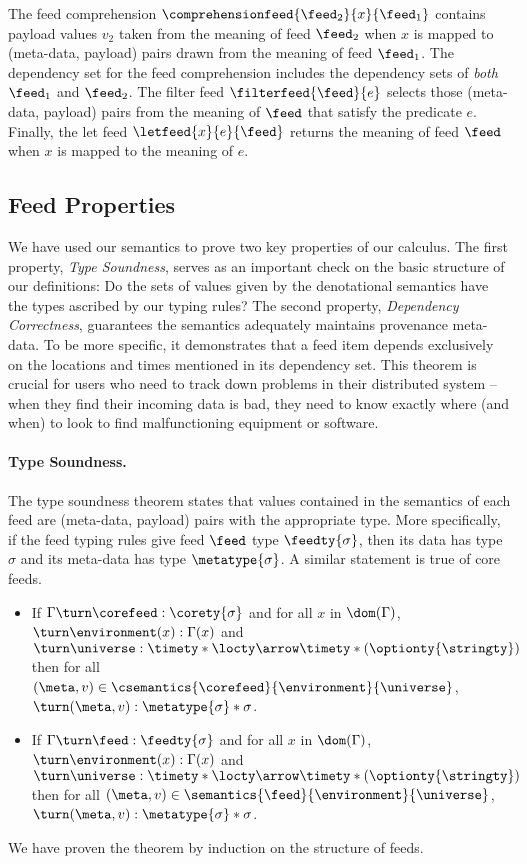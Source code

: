 The feed comprehension $\comprehensionfeed{\feed_2}{x}{\feed_1}$
contains payload values $v_2$ taken from the meaning of feed $\feed_2$
when $x$ is mapped to (meta-data, payload) pairs drawn from the meaning
of feed $\feed_1$.  The dependency set for the feed
comprehension includes the dependency sets of {\em both} $\feed_1$ and
$\feed_2$. 
The filter feed $\filterfeed{\feed}{e}$ selects those
(meta-data, payload) pairs from 
the meaning of $\feed$  that satisfy the predicate $e$.
Finally, the let feed $\letfeed{x}{e}{\feed}$ returns the meaning
of feed $\feed$ when $x$ is mapped to the meaning of $e$. 

\subsection{Feed Properties}
We have used our semantics to prove two key properties of our calculus.
The first property, {\em Type Soundness}, serves as an important check
on the basic structure of our definitions:  Do the sets of values given
by the denotational semantics have the types ascribed by our typing rules?
The second property, {\em Dependency Correctness}, guarantees the semantics
adequately maintains provenance meta-data.  To be more specific, it demonstrates
that a feed item depends exclusively on the locations and times mentioned
in its dependency set.  This theorem is crucial for users who need to
track down problems in their distributed system -- when they find their
incoming data is bad, they need to know exactly where (and when) to look 
to find malfunctioning equipment or software.

\paragraph*{Type Soundness.}
The type soundness theorem states that values
contained in the semantics of each feed are (meta-data, payload) pairs
with the appropriate type.  More specifically, if the feed typing
rules give feed $\feed$ type $\feedty{\sigma}$, 
then its data has type $\sigma$ and its meta-data has type $\metatype{\sigma}$.
A similar statement is true of core feeds.

\begin{theorem}
\begin{itemize}
\item If $\Gamma \turn \corefeed : \corety{\sigma}$ and
for all $x$ in $\dom(\Gamma)$, $\turn \environment(x) : \Gamma(x)$
and $\turn \universe : \timety * \locty \arrow \timety * (\optionty{\stringty})$
then
for all $(\meta,v) \in \csemantics{\corefeed}{\environment}{\universe}$,
$\turn (\meta,v) : \metatype{\sigma} * \sigma$. 
\item If $\Gamma \turn \feed : \feedty{\sigma}$ and
for all $x$ in $\dom(\Gamma)$, $\turn \environment(x) : \Gamma(x)$
and $\turn \universe : \timety * \locty \arrow \timety * (\optionty{\stringty})$
then
for all $(\meta,v) \in \semantics{\feed}{\environment}{\universe}$,
$\turn (\meta,v) : \metatype{\sigma} * \sigma$. 
\end{itemize}
\end{theorem}
\noindent
We have proven the theorem by induction on the structure of feeds.

